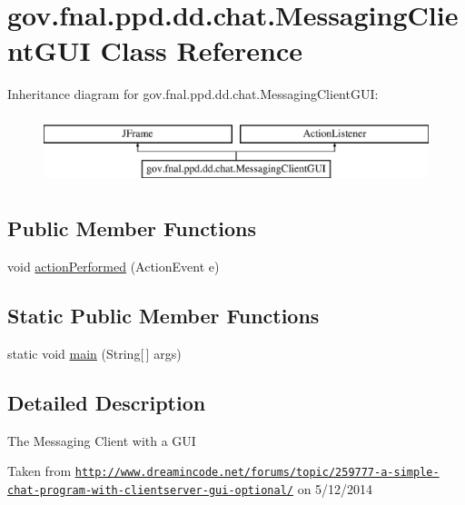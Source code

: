 \hypertarget{classgov_1_1fnal_1_1ppd_1_1dd_1_1chat_1_1MessagingClientGUI}{\section{gov.\-fnal.\-ppd.\-dd.\-chat.\-Messaging\-Client\-G\-U\-I Class Reference}
\label{classgov_1_1fnal_1_1ppd_1_1dd_1_1chat_1_1MessagingClientGUI}
}
Inheritance diagram for gov.\-fnal.\-ppd.\-dd.\-chat.\-Messaging\-Client\-G\-U\-I\-:\begin{figure}[H]
\begin{center}
\leavevmode
\includegraphics[height=2.000000cm]{classgov_1_1fnal_1_1ppd_1_1dd_1_1chat_1_1MessagingClientGUI}
\end{center}
\end{figure}
\subsection*{Public Member Functions}
\begin{DoxyCompactItemize}
\item 
void \hyperlink{classgov_1_1fnal_1_1ppd_1_1dd_1_1chat_1_1MessagingClientGUI_a5b1a28bbc7f3f3bcdd00cc219a4a6486}{action\-Performed} (Action\-Event e)
\end{DoxyCompactItemize}
\subsection*{Static Public Member Functions}
\begin{DoxyCompactItemize}
\item 
static void \hyperlink{classgov_1_1fnal_1_1ppd_1_1dd_1_1chat_1_1MessagingClientGUI_ac6a16db13da46b43cdbffbf7437f90bc}{main} (String\mbox{[}$\,$\mbox{]} args)
\end{DoxyCompactItemize}


\subsection{Detailed Description}
The Messaging Client with a G\-U\-I

Taken from \href{http://www.dreamincode.net/forums/topic/259777-a-simple-chat-program-with-clientserver-gui-optional/}{\tt http\-://www.\-dreamincode.\-net/forums/topic/259777-\/a-\/simple-\/chat-\/program-\/with-\/clientserver-\/gui-\/optional/} on 5/12/2014 


